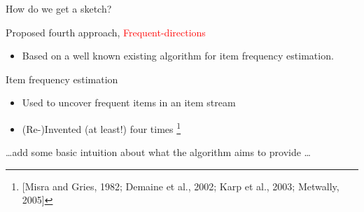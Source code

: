 \documentclass[first=dgreen,second=purple,logo=redque]{aaltoslides}
\newcommand{\vectornorm}[1]{\left\|#1\right\|}
\begin{document}
\begin{frame}[allowframebreaks=1]{How do we get a sketch?}
%  
%

Proposed fourth approach, \textcolor{red}{Frequent-directions}
\begin{itemize}
	\item Based on a well known existing algorithm for item frequency estimation.
\end{itemize}

\end{frame}

\begin{frame}[allowframebreaks=1]{Item frequency estimation}
\begin{itemize}
    \item Used to uncover \textcolor{dgreen}{frequent} items in an item stream
    \item (Re-)Invented (at least!) four times \cite{Misra82, Demaine02, Karp03, Metwally05}\footnote{[Misra and Gries, 1982; Demaine et al., 2002; Karp et al., 2003; Metwally, 2005]}
\end{itemize}

\ldots add some basic intuition about what the algorithm aims to provide \ldots
\end{frame}
\end{document}
